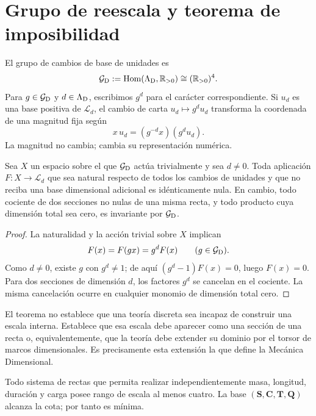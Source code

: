 \section{Grupo de reescala y teorema de imposibilidad}

El grupo de cambios de base de unidades es
\[
 \mathcal G_{\rm D}
 :=\operatorname{Hom}(\Lambda_{\rm D},\mathbb R_{>0})
 \cong(\mathbb R_{>0})^4.
\]
Para \(g\in\mathcal G_{\rm D}\) y \(d\in\Lambda_{\rm D}\), escribimos
\(g^d\) para el carácter correspondiente. Si \(u_d\) es una base positiva
de \(\mathcal L_d\), el cambio de carta
\(u_d\mapsto g^d u_d\) transforma la coordenada de una magnitud fija según
\[
 x\,u_d=(g^{-d}x)(g^du_d).
\]
La magnitud no cambia; cambia su representación numérica.

\begin{theorem}
\label{thm:no-go-dimensional-rango-cuatro}
Sea \(X\) un espacio sobre el que \(\mathcal G_{\rm D}\) actúa
trivialmente y sea \(d\ne0\). Toda aplicación
\(F:X\to\mathcal L_d\) que sea natural respecto de todos los cambios de
unidades y que no reciba una base dimensional adicional es idénticamente
nula. En cambio, todo cociente de dos secciones no nulas de una misma recta,
y todo producto cuya dimensión total sea cero, es invariante por
\(\mathcal G_{\rm D}\).
\end{theorem}

\begin{proof}
La naturalidad y la acción trivial sobre \(X\) implican
\[
 F(x)=F(gx)=g^dF(x)
 \qquad(g\in\mathcal G_{\rm D}).
\]
Como \(d\ne0\), existe \(g\) con \(g^d\ne1\); de aquí
\((g^d-1)F(x)=0\), luego \(F(x)=0\). Para dos secciones de dimensión
\(d\), los factores \(g^d\) se cancelan en el cociente. La misma cancelación
ocurre en cualquier monomio de dimensión total cero.
\end{proof}

El teorema no establece que una teoría discreta sea incapaz de construir una
escala interna. Establece que esa escala debe aparecer como una sección de
una recta o, equivalentemente, que la teoría debe extender su dominio por el
torsor de marcos dimensionales. Es precisamente esta extensión la que define
la Mecánica Dimensional.

\begin{corollary}
Todo sistema de rectas que permita realizar independientemente masa,
longitud, duración y carga posee rango de escala al menos cuatro. La base
\((\mathbf S,\mathbf C,\mathbf T,\mathbf Q)\) alcanza la cota; por tanto es
mínima.
\end{corollary}

